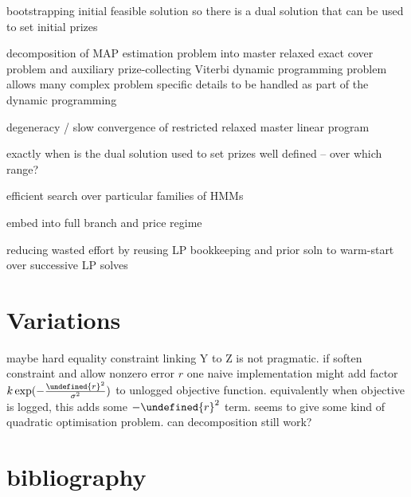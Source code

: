 \documentclass[twoside, 11pt]{article}
\let\norm\undefined
\DeclarePairedDelimiter\norm{\lVert}{\rVert}
\begin{document}
{bootstrapping initial feasible solution so there is a dual solution that can be used to set initial prizes}

{decomposition of MAP estimation problem into master relaxed exact cover problem and auxiliary prize-collecting Viterbi dynamic programming problem allows many complex problem specific details to be handled as part of the dynamic programming}

{degeneracy / slow convergence of restricted relaxed master linear program}

{exactly when is the dual solution used to set prizes well defined -- over which range?}

{efficient search over particular families of HMMs}

{embed into full branch and price regime}

{reducing wasted effort by reusing LP bookkeeping and prior soln to warm-start over successive LP solves}

\section{Variations}

{maybe hard equality constraint linking Y to Z is not pragmatic. if soften constraint and allow nonzero error $r$ one naive implementation might add factor $k \exp(-\frac{\norm{r}^2}{{\sigma^2}})$ to unlogged objective function. equivalently when objective is logged, this adds some $- \norm{r}^2$ term. seems to give some kind of quadratic optimisation problem. can decomposition still work?}

\section{bibliography}
\end{document}
